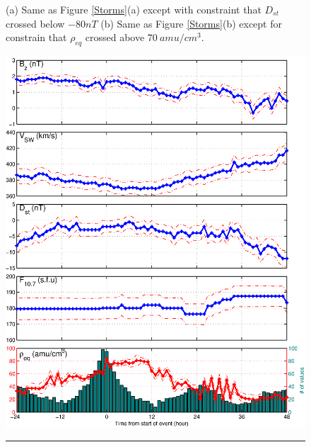 \documentclass[10pt,twocolumn]{article}
\begin{document}
\begin{figure}[htp!]
\caption{(a) Same as Figure \ref{Storms}(a) except with constraint that $D_{st}$ crossed below $-80nT$ (b) Same as Figure \ref{Storms}(b) except for constrain that $\rho_{eq}$ crossed above $70~amu/cm^3$.}
\label{Dspec}
\end{figure}

\begin{figure}[htp!]
\centering
\includegraphics[scale=0.45]{paperfigures/stormavs-diffden-10amu.eps}
\rule[1ex]{5cm}{0.5pt}

\end{figure}
\end{document}
